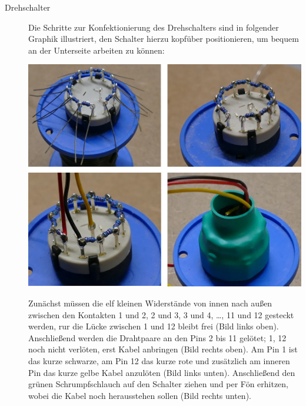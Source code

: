 \documentclass[paper=a4, open=any]{scrbook}
\begin{document}
					\begin{description}
						\item[Drehschalter] Die Schritte zur Konfektionierung des Drehschalters sind in folgender Graphik illustriert, den Schalter hierzu kopfüber positionieren, um bequem an der Unterseite arbeiten zu können:
						\begin{center}
							\includegraphics[width=.8\textwidth]{Drehschalter}
						\end{center}
						Zunächst müssen die elf kleinen Widerstände von innen nach außen zwischen den Kontakten 1 und 2, 2 und 3, 3 und 4, \dots, 11 und 12 gesteckt werden, rur die Lücke zwischen 1 und 12 bleibt frei (Bild links oben). Anschließend werden die Drahtpaare an den Pins 2 bis 11 gelötet; 1, 12 noch nicht verlöten, erst Kabel anbringen (Bild rechts oben). Am Pin 1 ist das kurze schwarze, am Pin 12 das kurze rote und zusätzlich am inneren Pin das kurze gelbe Kabel anzulöten (Bild links unten). Anschließend den grünen Schrumpfschlauch auf den Schalter ziehen und per Fön erhitzen, wobei die Kabel noch herausstehen sollen (Bild rechts unten).  
						

\end{description}
\end{document}
